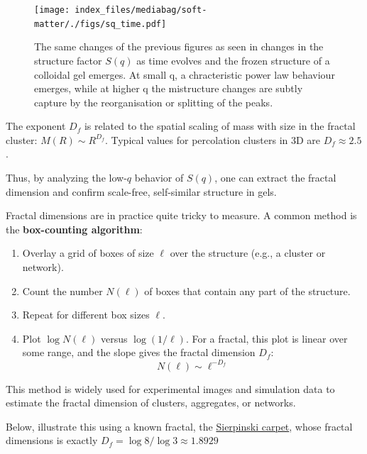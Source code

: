 \documentclass[
  letterpaper,
  enabledeprecatedfontcommands]{report}
\providecommand{\tightlist}{%
  \setlength{\itemsep}{0pt}\setlength{\parskip}{0pt}}
\begin{document}
\begin{figure}[H]

{\centering \texttt{[image: index\_files/mediabag/soft-matter/./figs/sq\_time.pdf]}

}

\caption{The same changes of the previous figures as seen in changes in
the structure factor \(S(q)\) as time evolves and the frozen structure
of a colloidal gel emerges. At small q, a chracteristic power law
behaviour emerges, while at higher q the mistructure changes are subtly
capture by the reorganisation or splitting of the peaks.}

\end{figure}%

The exponent \(D_f\) is related to the spatial scaling of mass with size
in the fractal cluster: \(M(R) \sim R^{D_f}\). Typical values for
percolation clusters in 3D are \(D_f \approx 2.5\).

Thus, by analyzing the low-\(q\) behavior of \(S(q)\), one can extract
the fractal dimension and confirm scale-free, self-similar structure in
gels.

\begin{tcolorbox}[enhanced jigsaw, toprule=.15mm, opacityback=0, colbacktitle=quarto-callout-note-color!10!white, title=\textcolor{quarto-callout-note-color}{\faInfo}\hspace{0.5em}{Measuring fractal dimensions: the box-counting algorithm}, leftrule=.75mm, rightrule=.15mm, bottomtitle=1mm, breakable, colframe=quarto-callout-note-color-frame, colback=white, toptitle=1mm, left=2mm, titlerule=0mm, coltitle=black, arc=.35mm, bottomrule=.15mm, opacitybacktitle=0.6]

Fractal dimensions are in practice quite tricky to measure. A common
method is the \textbf{box-counting algorithm}:

\begin{enumerate}
\def\labelenumi{\arabic{enumi}.}
\tightlist
\item
  Overlay a grid of boxes of size \(\ell\) over the structure (e.g., a
  cluster or network).
\item
  Count the number \(N(\ell)\) of boxes that contain any part of the
  structure.
\item
  Repeat for different box sizes \(\ell\).
\item
  Plot \(\log N(\ell)\) versus \(\log(1/\ell)\). For a fractal, this
  plot is linear over some range, and the slope gives the fractal
  dimension \(D_f\): \[
  N(\ell) \sim \ell^{-D_f}
  \]
\end{enumerate}

This method is widely used for experimental images and simulation data
to estimate the fractal dimension of clusters, aggregates, or networks.

Below, illustrate this using a known fractal, the
\href{https://en.wikipedia.org/wiki/Sierpiński_carpet}{Sierpinski
carpet}, whose fractal dimensions is exactly
\(D_f = \log{8}/\log{3}\approx 1.8929\)

\end{tcolorbox}
\end{document}
